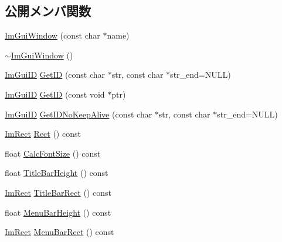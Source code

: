 \subsection*{公開メンバ関数}
\begin{DoxyCompactItemize}
\item 
\mbox{\hyperlink{struct_im_gui_window_abbc943558e96c8895237f0b55a66751b}{Im\+Gui\+Window}} (const char $\ast$name)
\item 
\mbox{\hyperlink{struct_im_gui_window_a8e81d730c3a39a71e6b6ca4654451c53}{$\sim$\+Im\+Gui\+Window}} ()
\item 
\mbox{\hyperlink{imgui_8h_a1785c9b6f4e16406764a85f32582236f}{Im\+Gui\+ID}} \mbox{\hyperlink{struct_im_gui_window_a66400a63bc0b54d7d29e08d1b1b1a42b}{Get\+ID}} (const char $\ast$str, const char $\ast$str\+\_\+end=N\+U\+LL)
\item 
\mbox{\hyperlink{imgui_8h_a1785c9b6f4e16406764a85f32582236f}{Im\+Gui\+ID}} \mbox{\hyperlink{struct_im_gui_window_aae21dffb343cabca9414499b827912a8}{Get\+ID}} (const void $\ast$ptr)
\item 
\mbox{\hyperlink{imgui_8h_a1785c9b6f4e16406764a85f32582236f}{Im\+Gui\+ID}} \mbox{\hyperlink{struct_im_gui_window_adc0a43f74a0b53a15a4bc4fea05524fe}{Get\+I\+D\+No\+Keep\+Alive}} (const char $\ast$str, const char $\ast$str\+\_\+end=N\+U\+LL)
\item 
\mbox{\hyperlink{struct_im_rect}{Im\+Rect}} \mbox{\hyperlink{struct_im_gui_window_a147da28bf5d167cbe0a363c4a578dea1}{Rect}} () const
\item 
float \mbox{\hyperlink{struct_im_gui_window_a6881ed65e208fb6e015d3ae6bccfc794}{Calc\+Font\+Size}} () const
\item 
float \mbox{\hyperlink{struct_im_gui_window_ad1580cc8b5bdf981c6ed2eb22ecd7dbb}{Title\+Bar\+Height}} () const
\item 
\mbox{\hyperlink{struct_im_rect}{Im\+Rect}} \mbox{\hyperlink{struct_im_gui_window_a06884e1bc80e460e51e1626b5b976196}{Title\+Bar\+Rect}} () const
\item 
float \mbox{\hyperlink{struct_im_gui_window_acfb8bdad2e3ea6102589813ae32d0364}{Menu\+Bar\+Height}} () const
\item 
\mbox{\hyperlink{struct_im_rect}{Im\+Rect}} \mbox{\hyperlink{struct_im_gui_window_a59df76c1445aaaf0b43456c83c1a88e5}{Menu\+Bar\+Rect}} () const
\end{DoxyCompactItemize}
